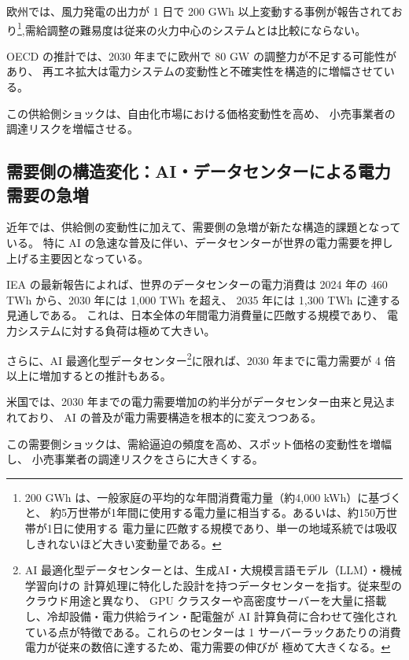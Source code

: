 欧州では、風力発電の出力が 1 日で 200 GWh 以上変動する事例が報告されており\footnote{
200 GWh は、一般家庭の平均的な年間消費電力量（約4,000 kWh）に基づくと、
約5万世帯が1年間に使用する電力量に相当する。あるいは、約150万世帯が1日に使用する
電力量に匹敵する規模であり、単一の地域系統では吸収しきれないほど大きい変動量である。
},需給調整の難易度は従来の火力中心のシステムとは比較にならない。


OECD の推計では、2030 年までに欧州で 80 GW の調整力が不足する可能性があり、
再エネ拡大は電力システムの変動性と不確実性を構造的に増幅させている\parencite{OECD2022Security}。

この供給側ショックは、自由化市場における価格変動性を高め、
小売事業者の調達リスクを増幅させる。


\subsection{需要側の構造変化：AI・データセンターによる電力需要の急増}

近年では、供給側の変動性に加えて、需要側の急増が新たな構造的課題となっている。
特に AI の急速な普及に伴い、データセンターが世界の電力需要を押し上げる主要因となっている。

IEA の最新報告によれば、世界のデータセンターの電力消費は  
2024 年の 460 TWh から、2030 年には 1,000 TWh を超え、  
2035 年には 1,300 TWh に達する見通しである\parencite{IEA2025EnergySupplyAI}。
これは、日本全体の年間電力消費量に匹敵する規模であり、
電力システムに対する負荷は極めて大きい。

さらに、AI 最適化型データセンター\footnote{
AI 最適化型データセンターとは、生成AI・大規模言語モデル（LLM）・機械学習向けの
計算処理に特化した設計を持つデータセンターを指す。従来型のクラウド用途と異なり、
GPU クラスターや高密度サーバーを大量に搭載し、冷却設備・電力供給ライン・配電盤が
AI 計算負荷に合わせて強化されている点が特徴である。これらのセンターは
1 サーバーラックあたりの消費電力が従来の数倍に達するため、電力需要の伸びが
極めて大きくなる。
}に限れば、2030 年までに電力需要が 4 倍以上に増加するとの推計もある\parencite{IEA2025AISurge}。

米国では、2030 年までの電力需要増加の約半分がデータセンター由来と見込まれており、
AI の普及が電力需要構造を根本的に変えつつある。

この需要側ショックは、需給逼迫の頻度を高め、スポット価格の変動性を増幅し、
小売事業者の調達リスクをさらに大きくする。

